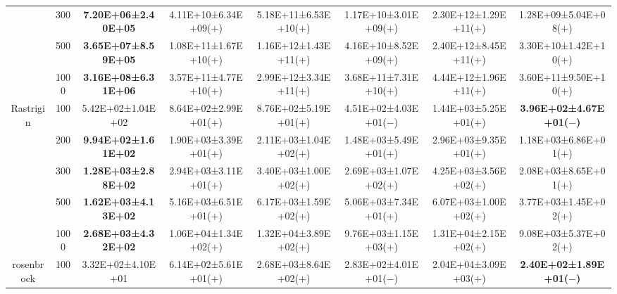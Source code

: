 \begin{tabular}{|cc|c|c|c|c|c|c|}
\multicolumn{1}{|c|}{}                            & 300       & \textbf{7.20E+06±2.40E+05} & 4.11E+10±6.34E+09($+$) & 5.18E+11±6.53E+10($+$) & 1.17E+10±3.01E+09($+$)                & 2.30E+12±1.29E+11($+$) & 1.28E+09±5.04E+08($+$)          \\ \cline{2-8} 
\multicolumn{1}{|c|}{}                            & 500       & \textbf{3.65E+07±8.59E+05} & 1.08E+11±1.67E+10($+$) & 1.16E+12±1.43E+11($+$) & 4.16E+10±8.52E+09($+$)                & 2.40E+12±8.45E+11($+$) & 3.30E+10±1.42E+10($+$)          \\ \cline{2-8} 
\multicolumn{1}{|c|}{}                            & 1000      & \textbf{3.16E+08±6.31E+06} & 3.57E+11±4.77E+10($+$) & 2.99E+12±3.34E+11($+$) & 3.68E+11±7.31E+10($+$)                & 4.44E+12±1.96E+11($+$) & 3.60E+11±9.50E+10($+$)          \\ \hline
\multicolumn{1}{|c|}{\multirow{5}{*}{Rastrigin}}  & 100       & 5.42E+02±1.04E+02          & 8.64E+02±2.99E+01($+$) & 8.76E+02±5.19E+01($+$) & 4.51E+02±4.03E+01($-$)                & 1.44E+03±5.25E+01($+$) & \textbf{3.96E+02±4.67E+01($-$)} \\ \cline{2-8} 
\multicolumn{1}{|c|}{}                            & 200       & \textbf{9.94E+02±1.61E+02} & 1.90E+03±3.39E+01($+$) & 2.11E+03±1.04E+02($+$) & 1.48E+03±5.49E+01($+$)                & 2.96E+03±9.35E+01($+$) & 1.18E+03±6.86E+01($+$)          \\ \cline{2-8} 
\multicolumn{1}{|c|}{}                            & 300       & \textbf{1.28E+03±2.88E+02} & 2.94E+03±3.11E+01($+$) & 3.40E+03±1.00E+02($+$) & 2.69E+03±1.07E+02($+$)                & 4.25E+03±3.56E+02($+$) & 2.08E+03±8.65E+01($+$)          \\ \cline{2-8} 
\multicolumn{1}{|c|}{}                            & 500       & \textbf{1.62E+03±4.13E+02} & 5.16E+03±6.51E+01($+$) & 6.17E+03±1.59E+02($+$) & 5.06E+03±7.34E+01($+$)                & 6.07E+03±1.00E+02($+$) & 3.77E+03±1.45E+02($+$)          \\ \cline{2-8} 
\multicolumn{1}{|c|}{}                            & 1000      & \textbf{2.68E+03±4.32E+02} & 1.06E+04±1.34E+02($+$) & 1.32E+04±3.89E+02($+$) & 9.76E+03±1.15E+03($+$)                & 1.31E+04±2.15E+02($+$) & 9.08E+03±5.37E+02($+$)          \\ \hline
\multicolumn{1}{|c|}{\multirow{5}{*}{rosenbrock}} & 100       & 3.32E+02±4.10E+01          & 6.14E+02±5.61E+01($+$) & 2.68E+03±8.64E+02($+$) & 2.83E+02±4.01E+01($-$)                & 2.04E+04±3.09E+03($+$) & \textbf{2.40E+02±1.89E+01($-$)} \\ \cline{2-8} 

\end{tabular}
